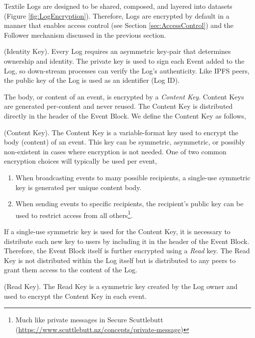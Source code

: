 \documentclass{textile}
\begin{document}
Textile Logs are designed to be shared, composed, and layered into datasets (Figure \ref{fig:LogEncryption}). Therefore, Logs are encrypted by default in a manner that enables access control (see Section  \ref{sec:AccessControl}) and the Follower mechanism discussed in the previous section.

\begin{definition}
(Identity Key). Every Log requires an asymmetric key-pair that determines ownership and identity. The private key is used to sign each Event added to the Log, so down-stream processes can verify the Log's authenticity. Like IPFS peers, the public key of the Log is used as an identifier (Log ID).
\end{definition}

The body, or content of an event, is encrypted by a \emph{Content Key}. Content Keys are generated per-content and never reused. The Content Key is distributed directly in the header of the Event Block. We define the Content Key as follows,

\begin{definition}
(Content Key). The Content Key is a variable-format key used to encrypt the body (content) of an event. This key can be symmetric, asymmetric, or possibly non-existent in cases where encryption is not needed. One of two common encryption choices will typically be used per event, 
\begin{enumerate}
\item When broadcasting events to many possible recipients, a single-use symmetric key is generated per unique content body.
\item When sending events to specific recipients, the recipient's public key can be used to restrict access from all others\footnote{Much like private messages in Secure Scuttlebutt (\url{https://www.scuttlebutt.nz/concepts/private-message})}.
\end{enumerate}
\end{definition}

If a single-use symmetric key is used for the Content Key, it is necessary to distribute each new key to users by including it in the header of the Event Block. Therefore, the Event Block itself is further encrypted using a \emph{Read} key. The Read Key is not distributed within the Log itself but is distributed to any peers to grant them access to the content of the Log. 

\begin{definition}
 (Read Key). The Read Key is a symmetric key created by the Log owner and used to encrypt the Content Key in each event.
\end{definition}
\end{document}
